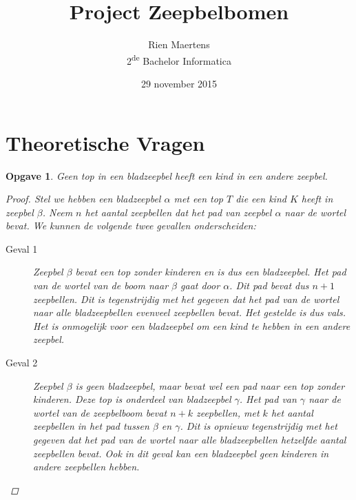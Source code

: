 \documentclass[12pt,hidelinks]{article}
\author{Rien Maertens\\
    2\textsuperscript{de} Bachelor Informatica}
\title{Project Zeepbelbomen}
\date{29 november 2015}
\newtheorem{opgave}{Opgave}
\begin{document}
    \maketitle
    \newpage
    \part{Theoretische Vragen}
    \begin{opgave}
        Geen top in een bladzeepbel heeft een kind in een andere zeepbel.
        \begin{proof}
            Stel we hebben een bladzeepbel $\alpha$ met een top $T$ die een kind $K$ heeft in zeepbel $\beta$. 
            Neem $n$ het aantal zeepbellen dat het pad van zeepbel $\alpha$ naar de wortel bevat. 
            We kunnen de volgende twee gevallen onderscheiden:
            \begin{description}
                \item[Geval 1] Zeepbel $\beta$ bevat een top zonder kinderen en is dus een bladzeepbel.
                    Het pad van de wortel van de boom naar $\beta$ gaat door $\alpha$.
                    Dit pad bevat dus $n+1$ zeepbellen. Dit is tegenstrijdig met het gegeven dat het pad van de wortel naar alle bladzeepbellen evenveel zeepbellen bevat.
                    Het gestelde is dus vals. Het is onmogelijk voor een bladzeepbel om een kind te hebben in een andere zeepbel.
                \item[Geval 2] Zeepbel $\beta$ is geen bladzeepbel, maar bevat wel een pad naar een top zonder kinderen.
                    Deze top is onderdeel van bladzeepbel $\gamma$.
                    Het pad van $\gamma$ naar de wortel van de zeepbelboom bevat $n+k$ zeepbellen, met $k$ het aantal zeepbellen in het pad tussen $\beta$ en $\gamma$.
                    Dit is opnieuw tegenstrijdig met het gegeven dat het pad van de wortel naar alle bladzeepbellen hetzelfde aantal zeepbellen bevat.
                    Ook in dit geval kan een bladzeepbel geen kinderen in andere zeepbellen hebben.
            \end{description}
        \end{proof}
    \end{opgave}
\end{document}
